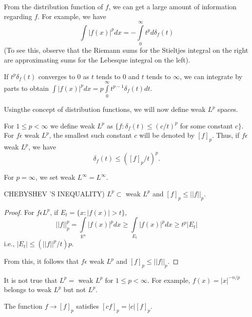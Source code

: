 From the distribution function of $f$, we can get a large amount of
information regarding $f$. For example, we have  
$$
\int |f(x) |^p dx = - \int\limits_{0}^{\infty} t^p d \delta_f (t)
$$
(To see this, observe that the Riemann sums for the Stieltjes integral
on the right are approximating sums for the Lebesque integral on the
left). 

If $t^p \delta_f (t)$ converges to $0$ as $t$ tends to 0 and $t$
tends to $\infty$, we can integrate by parts to obtain $\int | f (x)
|^p dx = p \int\limits_{0}^{\infty} t^{p-1} \delta_f (t) dt$. 

Using\pageoriginale the concept of distribution functions, we will now
define weak $L^p$ spaces. 

\begin{defi}\label{chap5:def5.7}%
  For $1 \le p < \infty$ we define weak  $L^p$ as $\{ f: \delta_f
  (t) \le (c/t)^p$ for some constant $c \}$. For $f \epsilon$ weak
  $L^p$, the smallest such constant $c$ will be denoted by
  $[f]_p$. Thus, if $f \epsilon $weak $L^p$, we have   
  $$
  \delta_f(t) \le ( [f]_p/t)^p.
  $$
\end{defi}

For $p = \infty$, we set weak $L^{\infty} =  L^{\infty}$.

\setcounter{prop}{7}
\begin{prop} \label{chap5:prop5.8}%
CHEBYSHEV 'S INEQUALITY) $L^p \subset$ weak $L^p$ and $[f]_p \le
  || f ||_p$. 
\end{prop}

\begin{proof}
  For $f \epsilon L^p $, if $E_t = \{ x: |f (x) | > t \}$,
  $$
  || f ||^p_p = \int\limits_{\mathbb{R}^n} | f(x) |^p dx \ge
  \int\limits_{E_t} |f (x) |^p dx \ge t^p |E_t| 
  $$
  i.e., \quad $| E_t | \le (|| f ||^{p}/t) p$.
  
  From this, it follows that $f \epsilon$ weak $L^p$ and $[f]_p \le
  || f ||_p$. 
\end{proof}

\setcounter{rem}{8}
\begin{rem} \label{chap5:rem5.9}%
  It is not true that $L^p =$ weak $L^p$ for $1 \le p < \infty$. For
  example, $f(x) = |x|^{-n/p}$ belongs to weak $L^p$ but not $L^p$. 
\end{rem}

\begin{rem}\label{chap5:rem5.10} %
The function $f \to [f]_p$ satisfies $[cf]_p = |c| [f]_p$. 
\end{rem}

